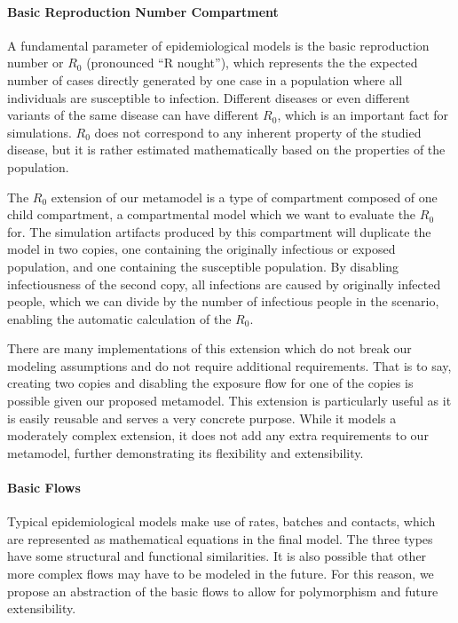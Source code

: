 \paragraph{Basic Reproduction Number Compartment}

A fundamental parameter of epidemiological models is the basic reproduction number or $R_0$ (pronounced ``R nought''), which represents the the expected number of cases directly generated by one case in a population where all individuals are susceptible to infection. Different diseases or even different variants of the same disease can have different $R_0$, which is an important fact for simulations. $R_0$ does not correspond to any inherent property of the studied disease, but it is rather estimated mathematically based on the properties of the population.

The $R_0$ extension of our metamodel is a type of compartment composed of one child compartment, a compartmental model which we want to evaluate the $R_0$ for. The simulation artifacts produced by this compartment will duplicate the model in two copies, one containing the originally infectious or exposed population, and one containing the susceptible population. By disabling infectiousness of the second copy, all infections are caused by originally infected people, which we can divide by the number of infectious people in the scenario, enabling the automatic calculation of the $R_0$.

There are many implementations of this extension which do not break our modeling assumptions and do not require additional requirements. That is to say, creating two copies and disabling the exposure flow for one of the copies is possible given our proposed metamodel. This extension is particularly useful as it is easily reusable and serves a very concrete purpose. While it models a moderately complex extension, it does not add any extra requirements to our metamodel, further demonstrating its flexibility and extensibility.

\paragraph{Basic Flows}
Typical epidemiological models make use of rates, batches and contacts, which are represented as mathematical equations in the final model. The three types have some structural and functional similarities. It is also possible that other more complex flows may have to be modeled in the future. For this reason, we propose an abstraction of the basic flows to allow for polymorphism and future extensibility. 


